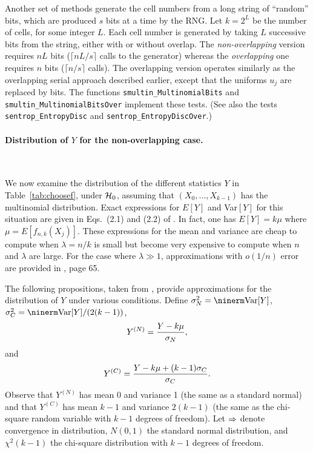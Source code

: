 Another set of methods generate the cell numbers from a long string
of ``random'' bits, which are produced $s$ bits at a time by the RNG.
Let $k = 2^L$ be the number of cells, for some integer $L$.
Each cell number is generated by taking $L$ successive bits from 
the string, either with or without overlap.
The {\em non-overlapping\/} version requires $nL$ bits
($\lceil nL/s\rceil$ calls to the generator) whereas the 
{\em overlapping\/} one requires $n$ bits ($\lceil n/s\rceil$ calls).
The overlapping version operates similarly as the overlapping serial
approach described earlier, except that the uniforms $u_j$ are replaced
by bits.  
The functions {\tt smultin\_MultinomialBits} and 
{\tt smultin\_MultinomialBitsOver} implement these tests.
(See also the tests 
{\tt sentrop\_EntropyDisc} and {\tt sentrop\_EntropyDiscOver}.)

\paragraph*{Distribution of $Y$ for the non-overlapping case.} \

We now examine the distribution of the different statistics $Y$ in
Table~\ref{tab:choosef}, under $\mathcal{H}_0$, assuming that $(X_0,\dots,X_{k-1})$
has the multinomial distribution.
Exact expressions for $E[Y]$ and Var$[Y]$ for this situation are given
in Eqs.\ (2.1) and (2.2) of \cite{rLEC02c}.
In fact, one has $E[Y] = k\mu$ where $\mu = E[f_{n,k}(X_j)]$.
These expressions for the mean and variance are cheap to compute 
when $\lambda = n/k$ is small
but become very expensive to compute when $n$ and $\lambda$ are large.
For the case where $\lambda \gg 1$, approximations with $o(1/n)$
error are provided in \cite{tREA88a}, page 65.

The following propositions, taken from \cite{rLEC02c}, provide
approximations for the distribution of $Y$ under various conditions.
Define $\sigma^2_N = \Var[Y]$, $\sigma^2_C = \Var[Y]/(2(k-1))$, 
\[
  Y^{(N)} = {Y - k\mu \over \sigma_N},
\]
and 
\[
  Y^{(C)} = {Y - k\mu + (k-1)\sigma_C\over\sigma_C}.
\]
Observe that $Y^{(N)}$ has mean 0 and variance 1 (the same as a
standard normal) and that $Y^{(C)}$ has mean $k-1$ and variance $2(k-1)$
(the same as the chi-square random variable with $k-1$ degrees of freedom).
Let $\Rightarrow$ denote convergence in distribution, 
$N(0,1)$ the standard normal distribution, and $\chi^2(k-1)$ 
the chi-square distribution with $k-1$ degrees of freedom.

